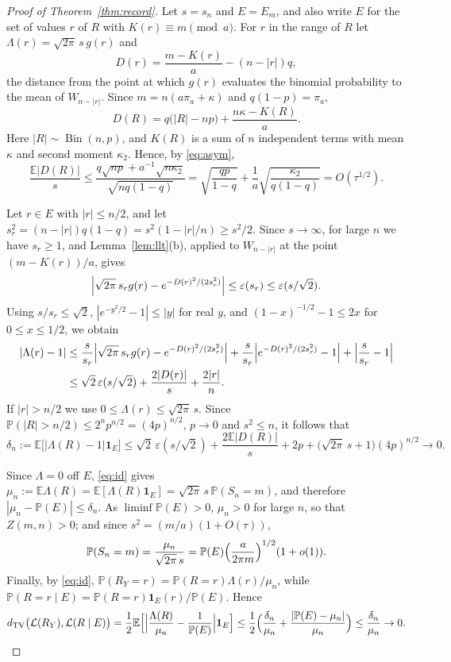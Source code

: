 \documentclass[11pt]{amsart}
\theoremstyle{definition}
\theoremstyle{remark}
\numberwithin{equation}{section}
\newcommand{\Pp}{\mathbb P}
\newcommand{\E}{\mathbb E}
\newcommand{\cL}{\mathcal L}
\newcommand{\dtv}{d_{\mathrm{TV}}}
\newcommand{\one}{\mathbf 1}
\DeclareMathOperator{\Bin}{Bin}
\begin{document}
\begin{proof}[Proof of Theorem~\ref{thm:record}]
Let $s=s_n$ and $E=E_m$, and also write $E$ for the set of values $r$ of $R$ with $K(r)\equiv m\pmod a$. For $r$ in the range of $R$ let $\Lambda(r)=\sqrt{2\pi}\,s\,g(r)$ and
\[
D(r)=\frac{m-K(r)}a-(n-|r|)q,
\]
the distance from the point at which $g(r)$ evaluates the binomial probability to the mean of $W_{n-|r|}$. Since $m=n(a\pi_a+\kappa)$ and $q(1-p)=\pi_a$,
\[
D(R)=q\bigl(|R|-np\bigr)+\frac{n\kappa-K(R)}a.
\]
Here $|R|\sim\Bin(n,p)$, and $K(R)$ is a sum of $n$ independent terms with mean $\kappa$ and second moment $\kappa_2$. Hence, by \eqref{eq:asym},
\[
\frac{\E|D(R)|}s\le\frac{q\sqrt{np}+a^{-1}\sqrt{n\kappa_2}}{\sqrt{nq(1-q)}}=\sqrt{\frac{qp}{1-q}}+\frac1a\sqrt{\frac{\kappa_2}{q(1-q)}}=O(\tau^{1/2}).
\]

Let $r\in E$ with $|r|\le n/2$, and let $s_r^2=(n-|r|)q(1-q)=s^2(1-|r|/n)\ge s^2/2$. Since $s\to\infty$, for large $n$ we have $s_r\ge1$, and Lemma~\ref{lem:llt}(b), applied to $W_{n-|r|}$ at the point $(m-K(r))/a$, gives
\[
\Bigl|\sqrt{2\pi}\,s_rg(r)-e^{-D(r)^2/(2s_r^2)}\Bigr|\le\varepsilon(s_r)\le\varepsilon(s/\sqrt2).
\]
Using $s/s_r\le\sqrt2$, $|e^{-y^2/2}-1|\le|y|$ for real $y$, and $(1-x)^{-1/2}-1\le2x$ for $0\le x\le1/2$, we obtain
\begin{align*}
|\Lambda(r)-1|&\le\frac s{s_r}\Bigl|\sqrt{2\pi}\,s_rg(r)-e^{-D(r)^2/(2s_r^2)}\Bigr|+\frac s{s_r}\Bigl|e^{-D(r)^2/(2s_r^2)}-1\Bigr|+\Bigl|\frac s{s_r}-1\Bigr|\\
&\le\sqrt2\,\varepsilon(s/\sqrt2)+\frac{2|D(r)|}s+\frac{2|r|}n.
\end{align*}
If $|r|>n/2$ we use $0\le\Lambda(r)\le\sqrt{2\pi}\,s$. Since $\Pp(|R|>n/2)\le2^np^{n/2}=(4p)^{n/2}$, $p\to0$ and $s^2\le n$, it follows that
\[
\delta_n:=\E\bigl[|\Lambda(R)-1|\one_E\bigr]\le\sqrt2\,\varepsilon(s/\sqrt2)+\frac{2\E|D(R)|}s+2p+\bigl(\sqrt{2\pi}\,s+1\bigr)(4p)^{n/2}\to0.
\]

Since $\Lambda=0$ off $E$, \eqref{eq:id} gives $\mu_n:=\E\Lambda(R)=\E[\Lambda(R)\one_E]=\sqrt{2\pi}\,s\,\Pp(S_n=m)$, and therefore $|\mu_n-\Pp(E)|\le\delta_n$. As $\liminf\Pp(E)>0$, $\mu_n>0$ for large $n$, so that $Z(m,n)>0$; and since $s^2=(m/a)(1+O(\tau))$,
\[
\Pp(S_n=m)=\frac{\mu_n}{\sqrt{2\pi}\,s}=\Pp(E)\Bigl(\frac a{2\pi m}\Bigr)^{1/2}(1+o(1)).
\]
Finally, by \eqref{eq:id}, $\Pp(R_Y=r)=\Pp(R=r)\Lambda(r)/\mu_n$, while $\Pp(R=r\mid E)=\Pp(R=r)\one_E(r)/\Pp(E)$. Hence
\[
\dtv\bigl(\cL(R_Y),\cL(R\mid E)\bigr)=\frac12\E\Bigl[\Bigl|\frac{\Lambda(R)}{\mu_n}-\frac1{\Pp(E)}\Bigr|\one_E\Bigr]\le\frac12\Bigl(\frac{\delta_n}{\mu_n}+\frac{|\Pp(E)-\mu_n|}{\mu_n}\Bigr)\le\frac{\delta_n}{\mu_n}\to0.\qedhere
\]
\end{proof}
\end{document}

